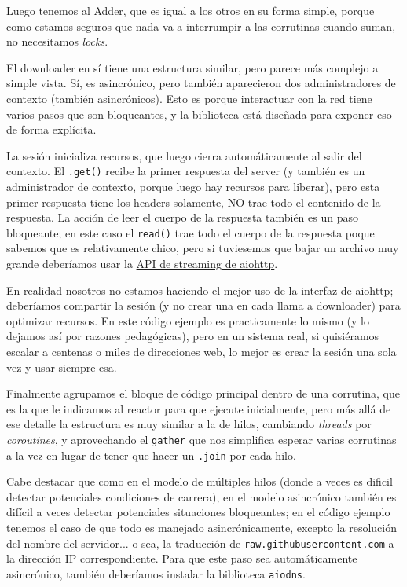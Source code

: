 Luego tenemos al Adder, que es igual a los otros en su forma simple, porque como estamos seguros que nada va a interrumpir a las corrutinas cuando suman, no necesitamos \textit{locks}.

El downloader en sí tiene una estructura similar, pero parece más complejo a simple vista. Sí, es asincrónico, pero también aparecieron dos administradores de contexto (también asincrónicos). Esto es porque interactuar con la red tiene varios pasos que son bloqueantes, y la biblioteca está diseñada para exponer eso de forma explícita.

La sesión inicializa recursos, que luego cierra automáticamente al salir del contexto. El \texttt{.get()} recibe la primer respuesta del server (y también es un administrador de contexto, porque luego hay recursos para liberar), pero esta primer respuesta tiene los headers solamente, NO trae todo el contenido de la respuesta. La acción de leer el cuerpo de la respuesta también es un paso bloqueante; en este caso el \texttt{read()} trae todo el cuerpo de la respuesta poque sabemos que es relativamente chico, pero si tuviesemos que bajar un archivo muy grande deberíamos usar la \href{https://docs.aiohttp.org/en/stable/streams.html}{API de streaming de aiohttp}.

En realidad nosotros no estamos haciendo el mejor uso de la interfaz de aiohttp; deberíamos compartir la sesión (y no crear una en cada llama a downloader) para optimizar recursos. En este código ejemplo es practicamente lo mismo (y lo dejamos así por razones pedagógicas), pero en un sistema real, si quisiéramos escalar a centenas o miles de direcciones web, lo mejor es crear la sesión una sola vez y usar siempre esa.

Finalmente agrupamos el bloque de código principal dentro de una corrutina, que es la que le indicamos al reactor para que ejecute inicialmente, pero más allá de ese detalle la estructura es muy similar a la de hilos, cambiando \textit{threads} por \textit{coroutines}, y aprovechando el \texttt{gather} que nos simplifica esperar varias corrutinas a la vez en lugar de tener que hacer un \texttt{.join} por cada hilo.

Cabe destacar que como en el modelo de múltiples hilos (donde a veces es dificil detectar potenciales condiciones de carrera), en el modelo asincrónico también es difícil a veces detectar potenciales situaciones bloqueantes; en el código ejemplo tenemos el caso de que todo es manejado asincrónicamente, excepto la resolución del nombre del servidor... o sea, la traducción de \texttt{raw.githubusercontent.com} a la dirección IP correspondiente. Para que este paso sea automáticamente asincrónico, también deberíamos instalar la biblioteca \texttt{aiodns}.


